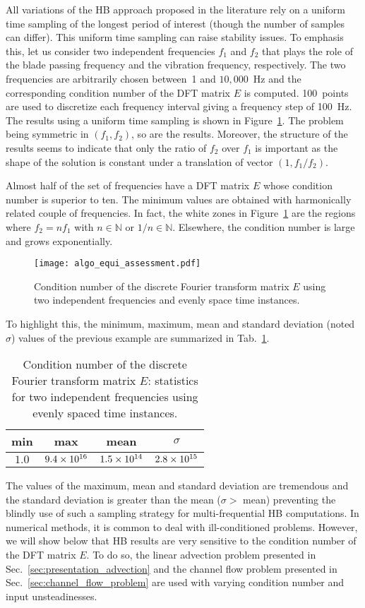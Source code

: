 All variations of the HB approach proposed in the literature rely on 
a uniform time sampling of the longest period of interest 
(though the number of samples can differ). 
This uniform time sampling can raise stability issues.
To emphasis this, let us consider two independent frequencies $f_1$
and $f_2$ that plays the role of the blade passing frequency and
the vibration frequency, respectively. The two frequencies are arbitrarily chosen between~1
and $10,000$~Hz and the corresponding
condition number of the DFT matrix $E$ is computed. 
100~points are used to discretize each 
frequency interval giving a frequency step of 100~Hz.
The results using a uniform time
sampling is shown in Figure~\ref{fig:algo_equi_assessment}.
The problem being symmetric in $(f_1, f_2)$, so are the results.
Moreover, the structure of the results seems to indicate that only the
ratio of $f_2$ over $f_1$ is important as the shape of the
solution is constant under a translation of vector $(1,f_1 / f_2)$.

Almost half of the set of frequencies have a DFT matrix $E$
whose condition number is superior to ten.
The minimum values are obtained with harmonically related couple
of frequencies. In fact, the white zones in Figure~\ref{fig:algo_equi_assessment}
are the regions where $f_2 = n f_1$ with $n \in \mathbb{N}$ or $1/n \in \mathbb{N}$.
Elsewhere, the condition number is large and grows exponentially.
\begin{figure}[htp]
  \centering
  \texttt{[image: algo\_equi\_assessment.pdf]}
  \caption{Condition number of the discrete Fourier transform matrix $E$
  using two independent frequencies and evenly space time instances.}
  \label{fig:algo_equi_assessment}
\end{figure}
To highlight this, the minimum, maximum, mean and 
standard deviation (noted $\sigma$) values of the
previous example are summarized in Tab.~\ref{tab:hb_algo_equi}.
\begin{table}[htp]
  \centering
  \begin{tabular}{cccc}
    \toprule
    min & max & mean & $\sigma$ \\
    \midrule
    $1.0$ & $9.4\times 10^{16}$ & $1.5\times 10^{14}$ & $2.8\times 10^{15}$ \\
    \bottomrule
  \end{tabular}
  \caption{Condition number of the discrete Fourier transform matrix $E$: 
  statistics for two independent frequencies using evenly spaced time instances.}
  \label{tab:hb_algo_equi}
\end{table}  
The values of the maximum, mean and standard deviation are tremendous
and the standard deviation is greater than the mean
($\sigma > $ mean) preventing the blindly use of such a sampling strategy for 
multi-frequential HB computations.
In numerical methods, it is common to deal with ill-conditioned
problems. However, we will show below that HB results are 
very sensitive to the condition number of the DFT matrix $E$.
To do so, the linear advection problem
presented in Sec.~\ref{sec:presentation_advection}
and the channel flow problem presented in 
Sec.~\ref{sec:channel_flow_problem}
are used with varying condition number and input unsteadinesses.
